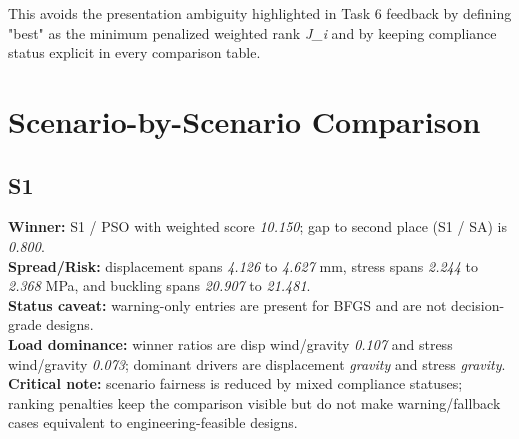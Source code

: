 \noindent This avoids the presentation ambiguity highlighted in Task 6 feedback by defining "best" as the minimum penalized weighted rank \textit{J\_i} and by keeping compliance status explicit in every comparison table.


\chapter{Scenario-by-Scenario Comparison}


\section{S1}


\begin{table}[H]
\centering
\scriptsize
\setlength{\tabcolsep}{4pt}
\renewcommand{\arraystretch}{1.1}
\end{table}


\begin{samepage}
\noindent \textbf{Winner:} S1 / PSO with weighted score \textit{10.150}; gap to second place (S1 / SA) is \textit{0.800}.\\
\noindent \textbf{Spread/Risk:} displacement spans \textit{4.126} to \textit{4.627} mm, stress spans \textit{2.244} to \textit{2.368} MPa, and buckling spans \textit{20.907} to \textit{21.481}.\\
\noindent \textbf{Status caveat:} warning-only entries are present for BFGS and are not decision-grade designs.\\
\noindent \textbf{Load dominance:} winner ratios are disp wind/gravity \textit{0.107} and stress wind/gravity \textit{0.073}; dominant drivers are displacement \textit{gravity} and stress \textit{gravity}.\\
\noindent \textbf{Critical note:} scenario fairness is reduced by mixed compliance statuses; ranking penalties keep the comparison visible but do not make warning/fallback cases equivalent to engineering-feasible designs.
\end{samepage}



